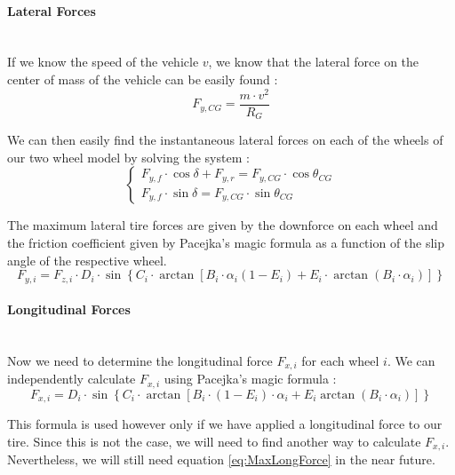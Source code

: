 \documentclass[a4paper, 11pt]{article}
\begin{document}
\paragraph{Lateral Forces} ~\\
If we know the speed of the vehicle $v$, we know that the lateral force on the center of mass of the vehicle can be easily found :
\begin{equation}
	F_{y,CG} = \frac{m\cdot v^2}{R_G}
	\label{eq:LateralForceCG}
\end{equation}

We can then easily find the instantaneous lateral forces on each of the wheels of our two wheel model by solving the system :
\begin{equation}
	\left\{\begin{matrix}
		F_{y,f}\cdot\cos\delta + F_{y,r} = F_{y,CG}\cdot\cos\theta_{CG}\\
		F_{y,f}\cdot\sin\delta = F_{y,CG}\cdot\sin\theta_{CG}
	\end{matrix} \right.
	\label{eq:LateralForcesSystem}
\end{equation}

The maximum lateral tire forces are given by the downforce on each wheel and the friction coefficient given by Pacejka's magic formula as a function of the slip angle of the respective wheel.
\begin{equation}
	F_{y,i} = F_{z,i}\cdot D_i\cdot\sin\left\{C_i\cdot\arctan\left[B_i\cdot\alpha_i\left(1-E_i \right) + E_i\cdot\arctan\left(B_i\cdot\alpha_i \right) \right] \right\}
	\label{eq:MaxLateralForce}
\end{equation}

\paragraph{Longitudinal Forces} ~\\
Now we need to determine the longitudinal force $F_{x,i}$ for each wheel $i$. We can independently calculate $F_{x,i}$ using Pacejka's magic formula :
\begin{equation}
	F_{x,i} = D_i\cdot\sin\left\{C_i\cdot\arctan\left[B_i\cdot\left(1-E_i \right)\cdot\alpha_i + E_i\arctan\left(B_i\cdot\alpha_i \right) \right] \right\}
	\label{eq:MaxLongForce}
\end{equation}

This formula is used however only if we have applied a longitudinal force to our tire. Since this is not the case, we will need to find another way to calculate $F_{x,i}$. Nevertheless, we will still need equation \ref{eq:MaxLongForce} in the near future.\\
\end{document}
